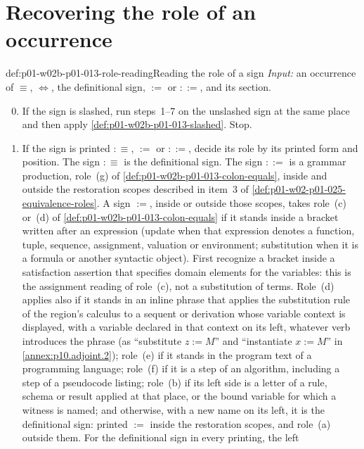 \section{Recovering the role of an occurrence}
\label{sec:p01-w02b-p01-013-procedure}

\begin{hbmethod}{def:p01-w02b-p01-013-role-reading}{Reading the role of a sign}
\emph{Input:} an occurrence of \(\equiv\), \(\Leftrightarrow\), the
definitional sign, \(:=\) or \(::=\), and its section.
\begin{enumerate}
  \setcounter{enumi}{-1}
  \item If the sign is slashed, run steps~1--7 on the unslashed sign at the
  same place and then apply \cref{def:p01-w02b-p01-013-slashed}.  Stop.
  \item If the sign is printed \(\mathrel{:\equiv}\), \(:=\) or \(::=\),
  decide its role by its printed form and position.  The sign
  \(\mathrel{:\equiv}\) is the definitional sign.  The sign \(::=\) is a
  grammar production, role~(g) of \cref{def:p01-w02b-p01-013-colon-equals},
  inside and outside the restoration scopes described in item~3 of
  \cref{def:p01-w02-p01-025-equivalence-roles}.  A sign \(:=\), inside or
  outside those scopes, takes role~(c) or~(d) of
  \cref{def:p01-w02b-p01-013-colon-equals} if it stands inside a bracket
  written after an expression (update when that expression denotes a
  function, tuple, sequence, assignment, valuation or environment;
  substitution when it is a formula or another syntactic object).
  First recognize a bracket inside a satisfaction assertion that specifies
  domain elements for the variables: this is the assignment reading of
  role~(c), not a substitution of terms.  Role~(d) applies
  also if it stands in an inline phrase that applies the substitution rule
  of the region's calculus to a sequent or derivation whose variable
  context is displayed, with a variable declared in that context on its
  left, whatever verb introduces the phrase (as ``substitute \(z:=M\)'' and
  ``instantiate \(x:=M\)'' in \cref{annex:p10.adjoint.2}); role~(e)
  if it stands in the program text of a programming language; role~(f) if
  it is a step of an algorithm, including a step of a pseudocode listing;
  role~(b) if its left side is a letter of a rule, schema or result applied
  at that place, or the bound variable for which a witness is named; and
  otherwise, with a new name on its left, it is the definitional sign:
  printed \(\mathrel{:=}\) inside the restoration scopes, and role~(a)
  outside them.  For the definitional sign in every printing, the left

\end{enumerate}
\end{hbmethod}
